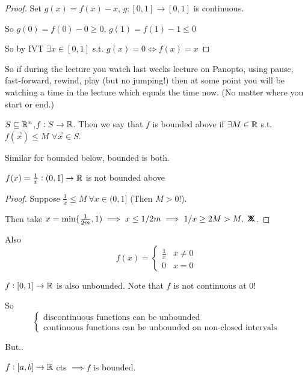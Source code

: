 \documentclass[10pt,twoside]{scrartcl}
\newcommand*{\cont}{%
  \mathsf{X}\mkern-8.5mu\mathsf{X}%
}
\begin{document}
\begin{proof}
Set $g(x) = f(x) - x$, $g: [0,1] \to [0,1]$ is continuous. 

So $g(0) = f(0) - 0 \geq 0$, $g(1) = f(1) -1 \leq 0$

So by IVT $\exists x\in[0,1]$ s.t. $g(x) = 0\iff f(x) = x$	
\end{proof}

So if during the lecture you watch last weeks lecture on Panopto, using pause, fast-forward, rewind, play (but no jumping!) then at some point you will be watching a time in the lecture which equals the time now. (No matter where you start or end.) \\

\begin{definition}
	$S \subseteq \mathbb{R}^n$,$f: S \to\mathbb{R}$. Then we say that $f$ is bounded above if $\exists M \in\mathbb{R}$ s.t. $f(\vec{x}) \leq M$ $\forall \vec{x} \in S$. 
	
	Similar for bounded below, bounded is both. 
\end{definition}

\begin{example}
$f(x) = \frac{1}{x}: (0,1] \to \mathbb{R}$ is not bounded above

\begin{proof}
Suppose $\frac{1}{x} \leq M~\forall x\in(0,1]$ (Then $M > 0!$).
 
Then take $x = \mathrm{min}\{\frac{1}{2m},1) \implies x \leq 1/2m \implies 1/x \geq 2M > M,~\cont$.
\end{proof}	
\end{example}

Also \[f(x) = \begin{cases}
 \frac{1}{x} & x\neq 0\\
 0 & x = 0	
 \end{cases}\]
 
 $f:[0,1]\to \mathbb{R}$ is also unbounded. Note that $f$ is not continuous at 0!
 
 So \[\begin{cases}
	\mbox{discontinuous functions can be unbounded}\\
	\mbox{continuous functions can be unbounded on non-closed intervals}
\end{cases}\]

But..

\begin{theorem}
$f:[a,b] \to \mathbb{R}$ cts $\implies f$ is bounded.	
\end{theorem}
\end{document}
